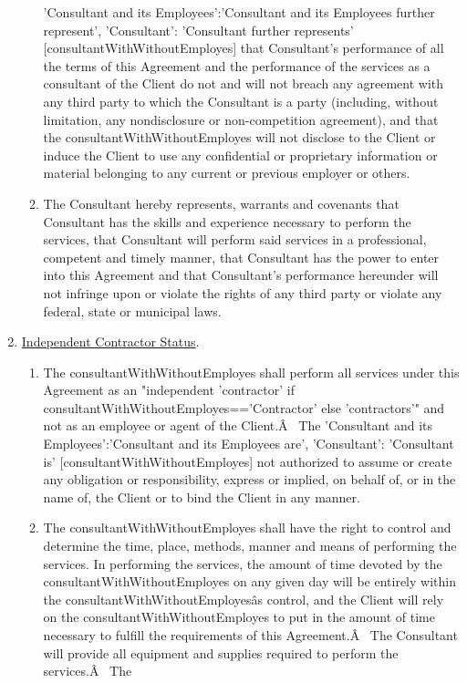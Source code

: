 \documentclass[12pt]{article}
\newcommand{\VAR}[1]{{\color{blue}#1}}
\begin{document}
\begin{enumerate}
\begin{enumerate}
        \VAR{
            {
                'Consultant and its Employees':'Consultant and its Employees further represent',
                'Consultant': 'Consultant further represents'
            }[consultantWithWithoutEmployes]
        }
        that Consultant's performance of all the terms of this Agreement and the performance of the services as a consultant of the Client do not and will not breach any agreement with any third party to which the Consultant is a party (including, without limitation, any nondisclosure or non-competition agreement), and that the \VAR{consultantWithWithoutEmployes} will not disclose to the Client or induce the Client to use any confidential or proprietary information or material belonging to any current or previous employer or others.
        \item The Consultant hereby represents, warrants and covenants that Consultant has the skills and experience necessary to perform the services, that Consultant will perform said services in a professional, competent and timely manner, that Consultant has the power to enter into this Agreement and that Consultant's performance hereunder will not infringe upon or violate the rights of any third party or violate any federal, state or municipal laws.
    \end{enumerate}
    \item \underline{Independent Contractor Status}.
    \begin{enumerate}
        \item The \VAR{consultantWithWithoutEmployes} shall perform all services under this Agreement as an "independent
        \VAR{ 'contractor' if consultantWithWithoutEmployes=='Contractor' else 'contractors'}" and not as an employee or agent of the Client.Â  The
        \VAR{
            {
                'Consultant and its Employees':'Consultant and its Employees are',
                'Consultant': 'Consultant is'
            }[consultantWithWithoutEmployes]
        }
        not authorized to assume or create any obligation or responsibility, express or implied, on behalf of, or in the name of, the Client or to bind the Client in any manner.
        \item The \VAR{consultantWithWithoutEmployes} shall have the right to control and determine the time, place, methods, manner and means of performing the services. In performing the services, the amount of time devoted by the \VAR{consultantWithWithoutEmployes} on any given day will be entirely within the \VAR{consultantWithWithoutEmployes}âs control, and the Client will rely on the \VAR{consultantWithWithoutEmployes} to put in the amount of time necessary to fulfill the requirements of this Agreement.Â  The Consultant will provide all equipment and supplies required to perform the services.Â  The

\end{enumerate}
\end{enumerate}
\end{document}
